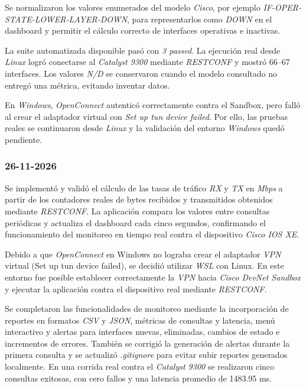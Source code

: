 \documentclass[12pt,a4paper]{article}
\begin{document}
Se normalizaron los valores enumerados del modelo \textit{Cisco}, por ejemplo \textit{IF-OPER-STATE-LOWER-LAYER-DOWN}, para representarlos como \textit{DOWN} en el dashboard y permitir el cálculo correcto de interfaces operativas e inactivas.

La suite automatizada disponible pasó con \textit{3 passed}. La ejecución real desde \textit{Linux} logró conectarse al \textit{Catalyst 9300} mediante \textit{RESTCONF} y mostró 66--67 interfaces. Los valores \textit{N/D} se conservaron cuando el modelo consultado no entregó una métrica, evitando inventar datos.

En \textit{Windows}, \textit{OpenConnect} autenticó correctamente contra el Sandbox, pero falló al crear el adaptador virtual con \textit{Set up tun device failed}. Por ello, las pruebas reales se continuaron desde \textit{Linux} y la validación del entorno \textit{Windows} quedó pendiente.

\subsubsection{26-11-2026}
Se implementó y validó el cálculo de las tasas de tráfico \textit{RX} y \textit{TX} en \textit{Mbps} a partir de los contadores reales de bytes recibidos y transmitidos obtenidos mediante \textit{RESTCONF}. La aplicación compara los valores entre consultas periódicas y actualiza el dashboard cada cinco segundos, confirmando el funcionamiento del monitoreo en tiempo real contra el dispositivo \textit{Cisco IOS XE}.

Debido a que \textit{OpenConnect} en Windows no lograba crear el adaptador \textit{VPN} virtual (Set up tun device failed), se decidió utilizar \textit{WSL} con Linux. En este entorno fue posible establecer correctamente la \textit{VPN} hacia \textit{Cisco DevNet Sandbox} y ejecutar la aplicación contra el dispositivo real mediante \textit{RESTCONF}.

Se completaron las funcionalidades de monitoreo mediante la incorporación de reportes en formatos \textit{CSV} y \textit{JSON}, métricas de consultas y latencia, menú interactivo y alertas para interfaces nuevas, eliminadas, cambios de estado e incrementos de errores. También se corrigió la generación de alertas durante la primera consulta y se actualizó \textit{.gitignore} para evitar subir reportes generados localmente. En una corrida real contra el \textit{Catalyst 9300} se realizaron cinco consultas exitosas, con cero fallos y una latencia promedio de 1483.95 ms.
\end{document}
